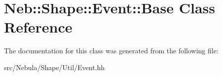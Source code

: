 \hypertarget{classNeb_1_1Shape_1_1Event_1_1Base}{\section{Neb\-:\-:Shape\-:\-:Event\-:\-:Base Class Reference}
\label{classNeb_1_1Shape_1_1Event_1_1Base}
}


The documentation for this class was generated from the following file\-:\begin{DoxyCompactItemize}
\item 
src/\-Nebula/\-Shape/\-Util/Event.\-hh\end{DoxyCompactItemize}
